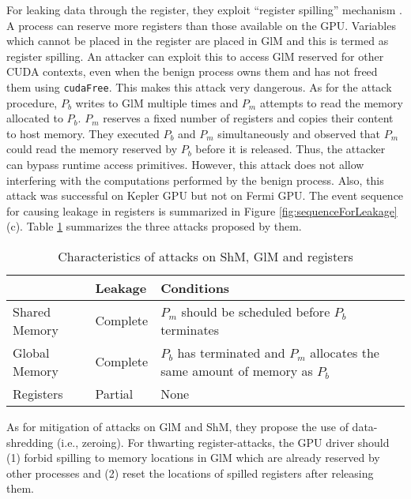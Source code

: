 For leaking data through the register, they exploit ``register spilling'' mechanism . A process can reserve more registers than those available on the GPU. Variables which cannot be placed in the register are placed in GlM and this is termed as register spilling. An attacker can exploit this to access GlM reserved for other CUDA contexts, even when the benign process owns them and has not freed them using {\tt cudaFree}. This makes this attack very dangerous. As for the attack procedure, $P_b$ writes to GlM multiple times and $P_m$ attempts to read the memory allocated to $P_b$. $P_m$ reserves a fixed number of registers and copies their content to host memory. They executed $P_b$ and $P_m$ simultaneously and observed that $P_m$ could read the memory reserved by $P_b$ before it is released. Thus, the attacker can bypass runtime access primitives.  However, this attack does not allow interfering with the computations performed by the benign process. Also, this attack was successful on Kepler GPU but not on Fermi GPU. The event sequence for causing leakage in registers is summarized in Figure \ref{fig:sequenceForLeakage}(c). Table \ref{tab:summaryOfCUDALeaks} summarizes the three attacks proposed by them. 

\begin{table}[htbp]
  \centering 
  \caption{Characteristics of attacks on ShM, GlM and registers \cite{pietro2016cuda}}
    \begin{tabular}{|l|l|p{9cm}|} \hline
          & Leakage & Conditions \\ \hline
    Shared Memory & Complete & $P_m$ should be scheduled before $P_b$ terminates  
    \\ \hline
    Global Memory & Complete & $P_{b}$ has terminated and $P_{m}$ allocates the same amount of memory as $P_{b}$ \\ \hline
    Registers & Partial & None \\ \hline
    \end{tabular}%
  \label{tab:summaryOfCUDALeaks}%
\end{table}%
 
 
 
As for mitigation of attacks on GlM and ShM, they propose the use of data-shredding (i.e., zeroing).  For thwarting register-attacks, the GPU driver should (1) forbid spilling to memory locations in GlM which are already reserved by other processes and (2) reset the locations of spilled registers after releasing them. 
 
 
 
